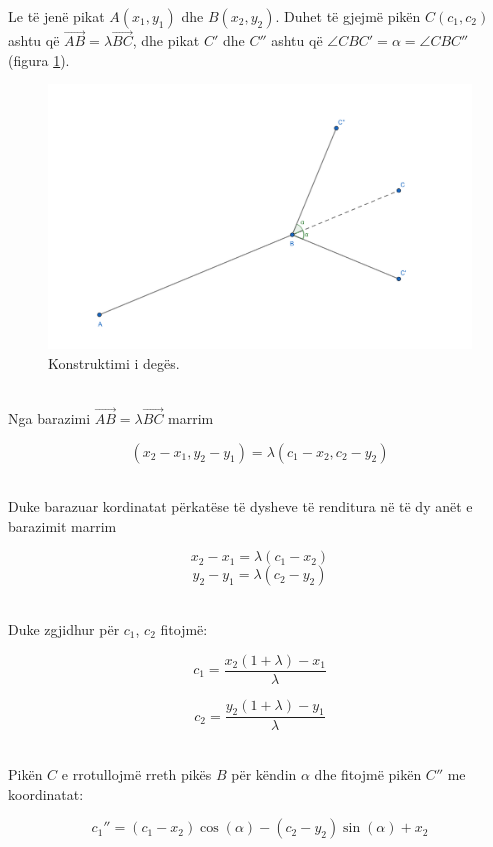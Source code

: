 Le të jenë pikat \( A(x_1, y_1) \) dhe \( B(x_2, y_2) \). Duhet të gjejmë pikën \( C(c_1, c_2) \) ashtu që \( \overrightarrow{AB} = \lambda \overrightarrow{BC} \), dhe pikat \( C' \) dhe \( C'' \) ashtu që \( \angle CBC' = \alpha = \angle CBC'' \) (figura \ref{fig:fractal_construction}).


\begin{figure}[htpb]
    \centering
    \includegraphics[width=1\linewidth]{tree_5.png}
    \caption{Konstruktimi i degës.}
    \label{fig:fractal_construction}
\end{figure}



\noindent \\ Nga barazimi \( \overrightarrow{AB} = \lambda \overrightarrow{BC} \) marrim

\[
(x_2 - x_1, y_2 - y_1) = \lambda (c_1 - x_2, c_2 - y_2)
\]

\noindent \\ Duke barazuar kordinatat përkatëse të dysheve të renditura në të dy anët e barazimit marrim

\[
x_2 - x_1 = \lambda (c_1 - x_2)
\]
\[
y_2 - y_1 = \lambda (c_2 - y_2)
\]


\noindent \\Duke zgjidhur për \(c_1\), \(c_2\) fitojmë:

\[
c_1 = \frac{x_2 (1 + \lambda) - x_1}{\lambda}
\]

\[
c_2 = \frac{y_2 (1 + \lambda) - y_1}{\lambda}
\]

\noindent \\ Pikën \( C \) e rrotullojmë rreth pikës \( B \) për këndin \( \alpha \) dhe fitojmë pikën \( C'' \) me koordinatat:

\[
c_1'' = (c_1 - x_2) \cos(\alpha) - (c_2 - y_2) \sin(\alpha) + x_2
\]

